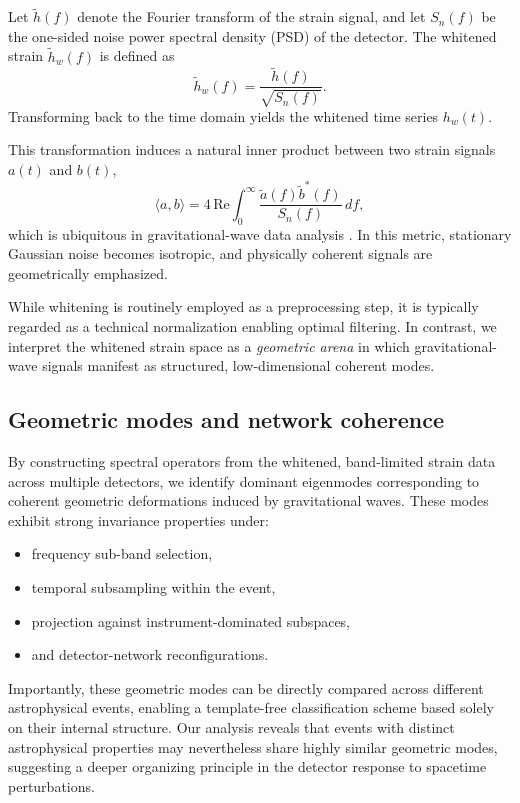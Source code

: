 \documentclass[11pt,a4paper]{article}
\begin{document}
Let $\tilde{h}(f)$ denote the Fourier transform of the strain signal, and let $S_n(f)$ be the one-sided noise power spectral density (PSD) of the detector. The whitened strain $\tilde{h}_w(f)$ is defined as
\begin{equation}
\tilde{h}_w(f) = \frac{\tilde{h}(f)}{\sqrt{S_n(f)}}.
\end{equation}
Transforming back to the time domain yields the whitened time series $h_w(t)$.

This transformation induces a natural inner product between two strain signals $a(t)$ and $b(t)$,
\begin{equation}
\langle a, b \rangle = 4 \, \mathrm{Re} \int_0^\infty \frac{\tilde{a}(f)\tilde{b}^*(f)}{S_n(f)} \, df,
\end{equation}
which is ubiquitous in gravitational-wave data analysis \cite{Creighton2011}. In this metric, stationary Gaussian noise becomes isotropic, and physically coherent signals are geometrically emphasized.

While whitening is routinely employed as a preprocessing step, it is typically regarded as a technical normalization enabling optimal filtering. In contrast, we interpret the whitened strain space as a \emph{geometric arena} in which gravitational-wave signals manifest as structured, low-dimensional coherent modes.

\subsection{Geometric modes and network coherence}

By constructing spectral operators from the whitened, band-limited strain data across multiple detectors, we identify dominant eigenmodes corresponding to coherent geometric deformations induced by gravitational waves. These modes exhibit strong invariance properties under:
\begin{itemize}
\item frequency sub-band selection,
\item temporal subsampling within the event,
\item projection against instrument-dominated subspaces,
\item and detector-network reconfigurations.
\end{itemize}

Importantly, these geometric modes can be directly compared across different astrophysical events, enabling a template-free classification scheme based solely on their internal structure. Our analysis reveals that events with distinct astrophysical properties may nevertheless share highly similar geometric modes, suggesting a deeper organizing principle in the detector response to spacetime perturbations.
\end{document}
